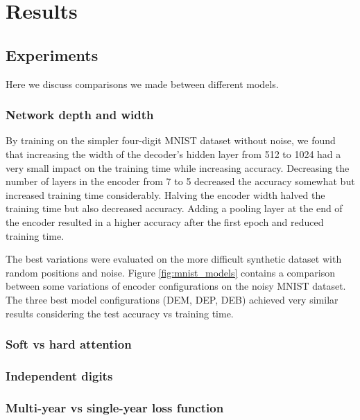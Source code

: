 \section{Results}



\subsection{Experiments}

Here we discuss comparisons we made between different models.

\subsubsection{Network depth and width} \label{sssec:exp_encoder}

By training on the simpler four-digit MNIST dataset without noise, 
we found that increasing the width of the decoder's hidden layer from 512 to 1024 had a very small impact on the training time while increasing accuracy. Decreasing the number of layers in the encoder from 7 to 5 decreased the accuracy somewhat but increased training time considerably. Halving the encoder width halved the training time but also decreased accuracy. Adding a pooling layer at the end of the encoder resulted in a higher accuracy after the first epoch and reduced training time.



The best variations were evaluated on the more difficult synthetic dataset with random positions and noise. Figure \ref{fig:mnist_models} contains a comparison between some variations of encoder configurations on the noisy MNIST dataset. The three best model configurations (DEM, DEP, DEB) achieved very similar results considering the test accuracy vs training time.









\subsubsection{Soft vs hard attention}

\subsubsection{Independent digits} \label{sssec:ind_digits}

\subsubsection{Multi-year vs single-year loss function}
